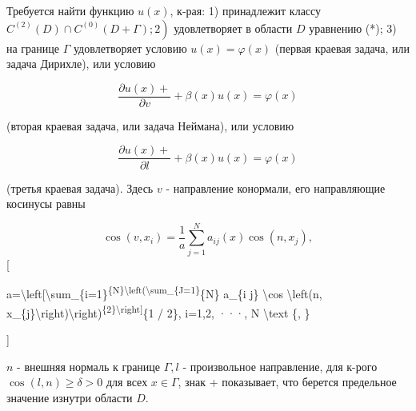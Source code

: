 \documentclass[10pt]{article}
\begin{document}
Требуется найти функцию $u(x)$, к-рая: 1) принадлежит классу $\left.C^{(2)}(D) \cap C^{(0)}(D+\Gamma) ; 2\right)$ удовлетворяет в области $D$ уравнению (*); 3) на границе $\Gamma$ удовлетворяет условию $u(x)=\varphi(x)$ (первая краевая задача, или задача Дирихле), или условию



\[

\frac{\partial u(x)+}{\partial v}+\beta(x) u(x)=\varphi(x)

\]



(вторая краевая задача, или задача Неймана), или условию



\[

\frac{\partial u(x)+}{\partial l}+\beta(x) u(x)=\varphi(x)

\]



(третья краевая задача). Здесь $v$ - направление конормали, его направляющие косинусы равны



\[

\cos \left(v, x_{i}\right)=\frac{1}{a} \sum_{j=1}^{N} a_{i j}(x) \cos \left(n, x_{j}\right),

\][



a=\textbackslash left[\textbackslash sum\_\{i=1\}\textsuperscript{\{N\}\textbackslash left(\textbackslash sum\_\{J=1\}}\{N\} a\_\{i j\} \textbackslash cos \textbackslash left(n, x\_\{j\}\textbackslash right)\textbackslash right)\textsuperscript{\{2\}\textbackslash right]}\{1 / 2\}, i=1,2, ···, N \textbackslash text \{, \}

]



$n$ - внешняя нормаль к границе $\Gamma, l$ - произвольное направление, для к-рого $\cos (l, n) \geqslant \delta>0$ для всех $x \in \Gamma$, знак + показывает, что берется предельное значение изнутри области $D$.
\end{document}
